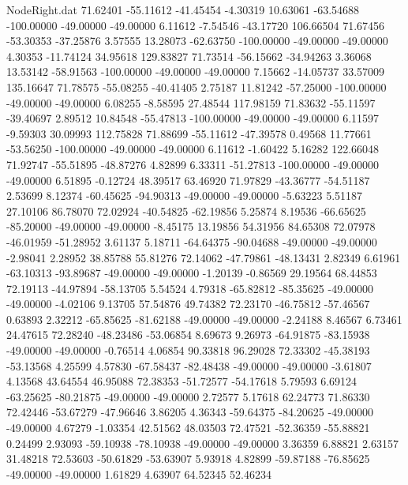 \begin{filecontents}{NodeRight.dat}
  71.62401  -55.11612  -41.45454    -4.30319   10.63061  -63.54688 -100.00000  -49.00000  -49.00000    6.11612   -7.54546  -43.17720  106.66504
  71.67456  -53.30353  -37.25876     3.57555   13.28073  -62.63750 -100.00000  -49.00000  -49.00000    4.30353  -11.74124   34.95618  129.83827
  71.73514  -56.15662  -34.94263     3.36068   13.53142  -58.91563 -100.00000  -49.00000  -49.00000    7.15662  -14.05737   33.57009  135.16647
  71.78575  -55.08255  -40.41405     2.75187   11.81242  -57.25000 -100.00000  -49.00000  -49.00000    6.08255   -8.58595   27.48544  117.98159
  71.83632  -55.11597  -39.40697     2.89512   10.84548  -55.47813 -100.00000  -49.00000  -49.00000    6.11597   -9.59303   30.09993  112.75828
  71.88699  -55.11612  -47.39578     0.49568   11.77661  -53.56250 -100.00000  -49.00000  -49.00000    6.11612   -1.60422    5.16282  122.66048
  71.92747  -55.51895  -48.87276     4.82899    6.33311  -51.27813 -100.00000  -49.00000  -49.00000    6.51895   -0.12724   48.39517   63.46920
  71.97829  -43.36777  -54.51187     2.53699    8.12374  -60.45625  -94.90313  -49.00000  -49.00000   -5.63223    5.51187   27.10106   86.78070
  72.02924  -40.54825  -62.19856     5.25874    8.19536  -66.65625  -85.20000  -49.00000  -49.00000   -8.45175   13.19856   54.31956   84.65308
  72.07978  -46.01959  -51.28952     3.61137    5.18711  -64.64375  -90.04688  -49.00000  -49.00000   -2.98041    2.28952   38.85788   55.81276
  72.14062  -47.79861  -48.13431     2.82349    6.61961  -63.10313  -93.89687  -49.00000  -49.00000   -1.20139   -0.86569   29.19564   68.44853
  72.19113  -44.97894  -58.13705     5.54524    4.79318  -65.82812  -85.35625  -49.00000  -49.00000   -4.02106    9.13705   57.54876   49.74382
  72.23170  -46.75812  -57.46567     0.63893    2.32212  -65.85625  -81.62188  -49.00000  -49.00000   -2.24188    8.46567    6.73461   24.47615
  72.28240  -48.23486  -53.06854     8.69673    9.26973  -64.91875  -83.15938  -49.00000  -49.00000   -0.76514    4.06854   90.33818   96.29028
  72.33302  -45.38193  -53.13568     4.25599    4.57830  -67.58437  -82.48438  -49.00000  -49.00000   -3.61807    4.13568   43.64554   46.95088
  72.38353  -51.72577  -54.17618     5.79593    6.69124  -63.25625  -80.21875  -49.00000  -49.00000    2.72577    5.17618   62.24773   71.86330
  72.42446  -53.67279  -47.96646     3.86205    4.36343  -59.64375  -84.20625  -49.00000  -49.00000    4.67279   -1.03354   42.51562   48.03503
  72.47521  -52.36359  -55.88821     0.24499    2.93093  -59.10938  -78.10938  -49.00000  -49.00000    3.36359    6.88821    2.63157   31.48218
  72.53603  -50.61829  -53.63907     5.93918    4.82899  -59.87188  -76.85625  -49.00000  -49.00000    1.61829    4.63907   64.52345   52.46234

\end{filecontents}
